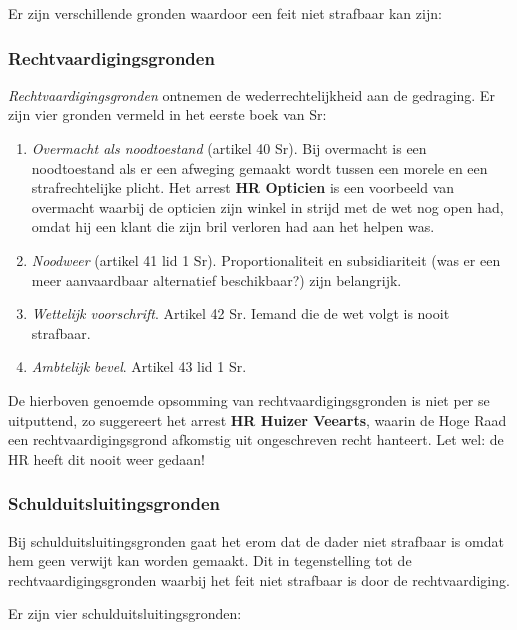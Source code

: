 \documentclass{article}
\begin{document}
Er zijn verschillende gronden waardoor een feit niet strafbaar kan zijn:

\subsubsection{Rechtvaardigingsgronden}

\emph{Rechtvaardigingsgronden} ontnemen de wederrechtelijkheid aan de
gedraging. Er zijn vier gronden vermeld in het eerste boek van Sr:

\begin{enumerate}
  \item \emph{Overmacht als noodtoestand} (artikel 40 Sr). Bij overmacht is
    een noodtoestand als er een afweging gemaakt wordt tussen een morele en
    een strafrechtelijke plicht. Het arrest \textbf{HR Opticien} is een
    voorbeeld van overmacht waarbij de opticien zijn winkel in strijd met
    de wet nog open had, omdat hij een klant die zijn bril verloren had aan
    het helpen was.

  \item \emph{Noodweer} (artikel 41 lid 1 Sr). Proportionaliteit en
    subsidiariteit (was er een meer aanvaardbaar alternatief beschikbaar?)
    zijn belangrijk.

  \item \emph{Wettelijk voorschrift}. Artikel 42 Sr. Iemand die de wet
    volgt is nooit strafbaar.

  \item \emph{Ambtelijk bevel}. Artikel 43 lid 1 Sr.
\end{enumerate}


De hierboven genoemde opsomming van rechtvaardigingsgronden is niet per se
uitputtend, zo suggereert het arrest \textbf{HR Huizer Veearts}, waarin de
Hoge Raad een rechtvaardigingsgrond afkomstig uit ongeschreven recht
hanteert. Let wel: de HR heeft dit nooit weer gedaan!

\subsubsection{Schulduitsluitingsgronden}

Bij schulduitsluitingsgronden gaat het erom dat de dader niet strafbaar is
omdat hem geen verwijt kan worden gemaakt. Dit in tegenstelling tot de
rechtvaardigingsgronden waarbij het feit niet strafbaar is door de
rechtvaardiging.

Er zijn vier schulduitsluitingsgronden:
\end{document}
